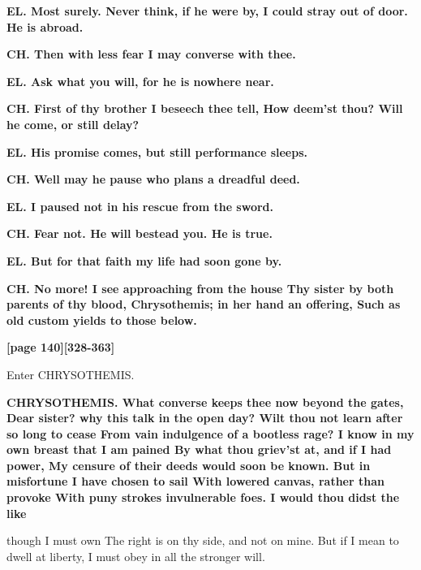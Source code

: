 \documentclass[11pt,letter]{book}
\begin{document}
\par \textbf{EL. Most surely. Never think, if he were by, I could stray out of door. He is abroad.}
\par 

\par \textbf{CH. Then with less fear I may converse with thee.}
\par 

\par \textbf{EL. Ask what you will, for he is nowhere near.}
\par 

\par \textbf{CH. First of thy brother I beseech thee tell, How deem’st thou? Will he come, or still delay?}
\par 

\par \textbf{EL. His promise comes, but still performance sleeps.}
\par 

\par \textbf{CH. Well may he pause who plans a dreadful deed.}
\par 

\par \textbf{EL. I paused not in his rescue from the sword.}
\par 

\par \textbf{CH. Fear not. He will bestead you. He is true.}
\par 

\par \textbf{EL. But for that faith my life had soon gone by.}
\par 

\par \textbf{CH. No more! I see approaching from the house Thy sister by both parents of thy blood, Chrysothemis; in her hand an offering, Such as old custom yields to those below.}
\par 

\par \textbf{[page 140][328-363]}
\par 

\par  Enter CHRYSOTHEMIS.

\par \textbf{CHRYSOTHEMIS. What converse keeps thee now beyond the gates, Dear sister? why this talk in the open day? Wilt thou not learn after so long to cease From vain indulgence of a bootless rage? I know in my own breast that I am pained By what thou griev’st at, and if I had power, My censure of their deeds would soon be known. But in misfortune I have chosen to sail With lowered canvas, rather than provoke With puny strokes invulnerable foes. I would thou didst the like}
\par   though I must own The right is on thy side, and not on mine. But if I mean to dwell at liberty, I must obey in all the stronger will.
\end{document}
